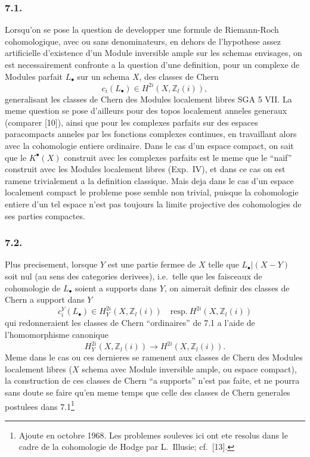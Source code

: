 \subsubsection*{7.1.}
Lorsqu'on se pose la question de developper une formule de Riemann-Roch cohomologique, avec ou sans denominateurs, en dehors de l'hypothese assez artificielle d'existence d'un Module inversible ample sur les schemas envisages, on est necessairement confronte a la question d'une definition, pour un complexe de Modules parfait $L_{\bullet}$ sur un schema $X$, des classes de Chern
\[
c_i(L_{\bullet}) \in H^{2i}(X, \mathbb{Z}_l(i)),
\]
generalisant les classes de Chern des Modules localement libres SGA 5 VII. La meme question se pose d'ailleurs pour des topos localement anneles generaux (comparer [10]), ainsi que pour les complexes parfaits sur des espaces paracompacts anneles par les fonctions complexes continues, en travaillant alors avec la cohomologie entiere ordinaire. Dans le cas d'un espace compact, on sait que le $K^{\bullet}(X)$ construit avec les complexes parfaits est le meme que le ``naif'' construit avec les Modules localement libres (Exp.\ IV), et dans ce cas on est ramene trivialement a la definition classique. Mais deja dans le cas d'un espace localement compact le probleme pose semble non trivial, puisque la cohomologie entiere d'un tel espace n'est pas toujours la limite projective des cohomologies de ses parties compactes.

\subsubsection*{7.2.}
Plus precisement, lorsque $Y$ est une partie fermee de $X$ telle que $L_{\bullet}|(X-Y)$ soit nul (au sens des categories derivees), i.e.\ telle que les faisceaux de cohomologie de $L_{\bullet}$ soient a supports dans $Y$, on aimerait definir des classes de Chern a support dans $Y$
\[
c_i^{Y}(L_{\bullet}) \in H_Y^{2i}(X, \mathbb{Z}_l(i)) \quad \text{resp.}\ H^{2i}(X, \mathbb{Z}_l(i))
\]
qui redonneraient les classes de Chern ``ordinaires'' de 7.1 a l'aide de l'homomorphisme canonique
\[
H_Y^{2i}(X, \mathbb{Z}_l(i)) \longrightarrow H^{2i}(X, \mathbb{Z}_l(i)).
\]
Meme dans le cas ou ces dernieres se ramenent aux classes de Chern des Modules localement libres ($X$ schema avec Module inversible ample, ou espace compact), la construction de ces classes de Chern ``a supports'' n'est pas faite, et ne pourra sans doute se faire qu'en meme temps que celle des classes de Chern generales postulees dans 7.1\footnote{Ajoute en octobre 1968. Les problemes souleves ici ont ete resolus dans le cadre de la cohomologie de Hodge par L.\ Illusie; cf.\ [13].}

